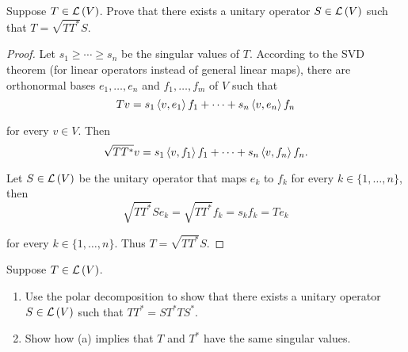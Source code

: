 \begin{exercise}
    Suppose $T\in\mathcal{L}\left({V}\right)$. Prove that there exists a unitary operator $S \in \mathcal{L}\left({V}\right)$ such that $T = \sqrt{TT^{*}}S$.
\end{exercise}

\begin{proof}
    Let $s_{1}\geq \cdots \geq s_{n}$ be the singular values of $T$. According to the SVD theorem (for linear operators instead of general linear maps), there are orthonormal bases $e_{1}, \ldots, e_{n}$ and $f_{1}, \ldots, f_{m}$ of $V$ such that
    \[
        Tv = s_{1}\left\langle{v,e_{1}}\right\rangle f_{1} + \cdots + s_{n}\left\langle{v,e_{n}}\right\rangle f_{n}
    \]

    for every $v\in V$. Then
    \[
        \sqrt{TT^{*}}v =  s_{1}\left\langle{v,f_{1}}\right\rangle f_{1} + \cdots + s_{n}\left\langle{v,f_{n}}\right\rangle f_{n}.
    \]

    Let $S\in\mathcal{L}\left({V}\right)$ be the unitary operator that maps $e_{k}$ to $f_{k}$ for every $k\in\{1,\ldots,n\}$, then
    \[
        \sqrt{TT^{*}}Se_{k} = \sqrt{TT^{*}}f_{k} = s_{k}f_{k} = Te_{k}
    \]

    for every $k\in\{1,\ldots,n\}$. Thus $T = \sqrt{TT^{*}}S$.
\end{proof}
\newpage

\begin{exercise}
    Suppose $T\in\mathcal{L}\left({V}\right)$.
    \begin{enumerate}[label={(\alph*)}]
        \item Use the polar decomposition to show that there exists a unitary operator $S\in\mathcal{L}\left({V}\right)$ such that $TT^{*} = ST^{*}TS^{*}$.
        \item Show how (a) implies that $T$ and $T^{*}$ have the same singular values.
    \end{enumerate}
\end{exercise}

